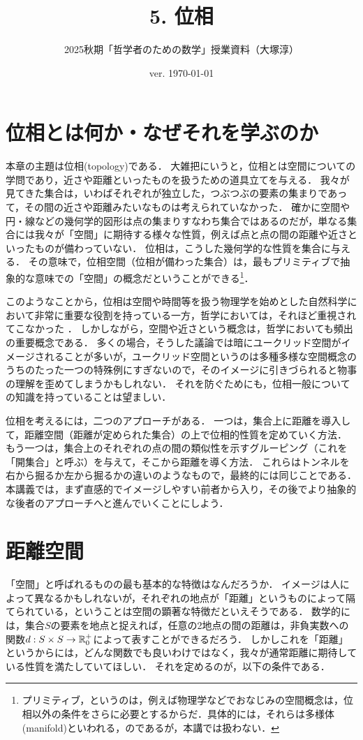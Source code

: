 \documentclass[11pt,a4paper, dvipdfmx]{jsarticle}
\begin{document}
\title{5. 位相}
\author{2025秋期「哲学者のための数学」授業資料（大塚淳）}
\date{ver. \today}
\maketitle

\section{位相とは何か・なぜそれを学ぶのか}

本章の主題は位相(topology)である．
大雑把にいうと，位相とは空間についての学問であり，近さや距離といったものを扱うための道具立てを与える．
我々が見てきた集合は，いわばそれぞれが独立した，つぶつぶの要素の集まりであって，その間の近さや距離みたいなものは考えられていなかった．
確かに空間や円・線などの幾何学的図形は点の集まりすなわち集合ではあるのだが，単なる集合には我々が「空間」に期待する様々な性質，例えば点と点の間の距離や近さといったものが備わっていない．
位相は，こうした幾何学的な性質を集合に与える．
その意味で，位相空間（位相が備わった集合）は，最もプリミティブで抽象的な意味での「空間」の概念だということができる\footnote{プリミティブ，というのは，例えば物理学などでおなじみの空間概念は，位相以外の条件をさらに必要とするからだ．具体的には，それらは多様体(manifold)といわれる，のであるが，本講では扱わない．}．

このようなことから，位相は空間や時間等を扱う物理学を始めとした自然科学において非常に重要な役割を持っている一方，哲学においては，それほど重視されてこなかった \citep{Mormann2020-ly, Fletcher2022-ve}．
しかしながら，空間や近さという概念は，哲学においても頻出の重要概念である．
多くの場合，そうした議論では暗にユークリッド空間がイメージされることが多いが，ユークリッド空間というのは多種多様な空間概念のうちのたった一つの特殊例にすぎないので，そのイメージに引きづられると物事の理解を歪めてしまうかもしれない．
それを防ぐためにも，位相一般についての知識を持っていることは望ましい．

位相を考えるには，二つのアプローチがある．
一つは，集合上に距離を導入して，距離空間（距離が定められた集合）の上で位相的性質を定めていく方法．
もう一つは，集合上のそれぞれの点の間の類似性を示すグルーピング（これを「開集合」と呼ぶ）を与えて，そこから距離を導く方法．
これらはトンネルを右から掘るか左から掘るかの違いのようなもので，最終的には同じことである．
本講義では，まず直感的でイメージしやすい前者から入り，その後でより抽象的な後者のアプローチへと進んでいくことにしよう．


\section{距離空間}
「空間」と呼ばれるものの最も基本的な特徴はなんだろうか．
イメージは人によって異なるかもしれないが，それぞれの地点が「距離」というものによって隔てられている，ということは空間の顕著な特徴だといえそうである．
数学的には，集合$S$の要素を地点と捉えれば，任意の2地点の間の距離は，非負実数への関数$d:S \times S \to \mathbb{R}^+_0$によって表すことができるだろう．
しかしこれを「距離」というからには，どんな関数でも良いわけではなく，我々が通常距離に期待している性質を満たしていてほしい．
それを定めるのが，以下の条件である．
\end{document}
